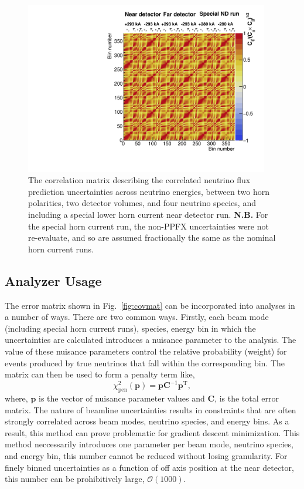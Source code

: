 \documentclass{article}
\begin{document}
\begin{figure}
  \centering
  \includegraphics[width=0.95\textwidth]{plots/mats/ErrorMatrices_corrmat}
  \caption{The correlation matrix describing the correlated neutrino flux prediction uncertainties across neutrino energies, between two horn polarities, two detector volumes, and four neutrino species, and including a special lower horn current near detector run. \textbf{N.B.} For the special horn current run, the non-PPFX uncertainties were not re-evaluate, and so are assumed fractionally the same as the nominal horn current runs.}
  \label{fig:corrmat}
\end{figure}

\subsection{Analyzer Usage}

The error matrix shown in Fig.~\ref{fig:covmat} can be incorporated into analyses in a number of ways. There are two common ways. Firstly, each beam mode (including special horn current runs), species, energy bin in which the uncertainties are calculated introduces a nuisance parameter to the analysis. The value of these nuisance parameters control the relative probability (weight) for events produced by true neutrinos that fall within the corresponding bin. The matrix can then be used to form a penalty term like,
\[\chi^{2}_\textrm{pen}\left(\textbf{p}\right)=\textbf{p}\mathbf{C}^{-1}\textbf{p}^\mathrm{T},\]
where, $\textbf{p}$ is the vector of nuisance parameter values and $\mathbf{C}$, is the total error matrix. The nature of beamline uncertainties results in constraints that are often strongly correlated across beam modes, neutrino species, and energy bins. As a result, this method can prove problematic for gradient descent minimization. This method neccessarily introduces one parameter per beam mode, neutrino species, and energy bin, this number cannot be reduced without losing granularity. For finely binned uncertainties as a function of off axis position at the near detector, this number can be prohibitively large, $\mathcal{O}\left(1000\right)$.
\end{document}
